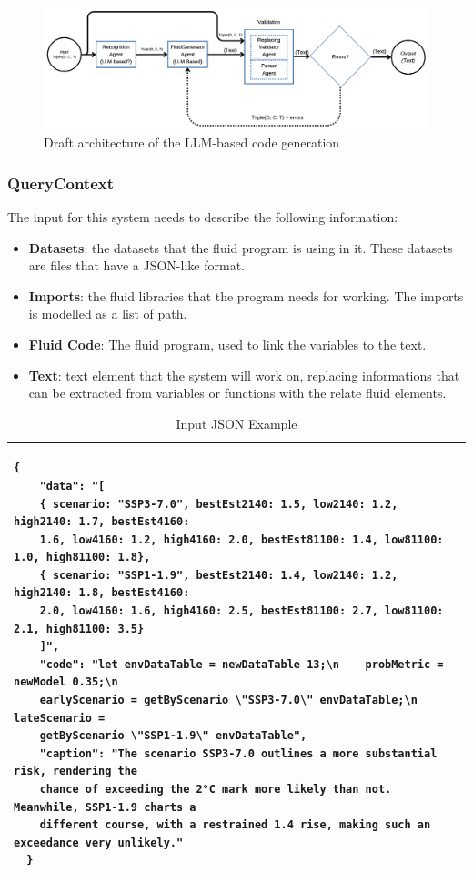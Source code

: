 \begin{figure}
    \centering
    \includegraphics[width=0.95\linewidth]{fig/fluid-llm-architecture.png}
    \caption{Draft architecture of the LLM-based code generation}
    \label{fig:fluid-llm-architecture}
\end{figure}

\subsubsection{QueryContext}
The input for this system needs to describe the following information:
\begin{itemize}
    \item \textbf{Datasets}: the datasets that the fluid program is using in it. These datasets are files that have a JSON-like format.
    \item \textbf{Imports}: the fluid libraries that the program needs for working. The imports is modelled as a list of path.
    \item \textbf{Fluid Code}: The fluid program, used to link the variables to the text.
    \item \textbf{Text}: text element that the system will work on, replacing informations that can be extracted from variables or functions with the relate fluid elements.
\end{itemize}

\begin{table}[!ht]
    \centering
    \caption{Input JSON Example \label{tab:json_fluid_input}}
    \begin{tabular}{p{13cm}}
    \hline
    \hline
    \begin{verbatim}
{
    "data": "[
    { scenario: "SSP3-7.0", bestEst2140: 1.5, low2140: 1.2, high2140: 1.7, bestEst4160:
    1.6, low4160: 1.2, high4160: 2.0, bestEst81100: 1.4, low81100: 1.0, high81100: 1.8},
    { scenario: "SSP1-1.9", bestEst2140: 1.4, low2140: 1.2, high2140: 1.8, bestEst4160:
    2.0, low4160: 1.6, high4160: 2.5, bestEst81100: 2.7, low81100: 2.1, high81100: 3.5}
    ]",
    "code": "let envDataTable = newDataTable 13;\n    probMetric = newModel 0.35;\n
    earlyScenario = getByScenario \"SSP3-7.0\" envDataTable;\n    lateScenario =
    getByScenario \"SSP1-1.9\" envDataTable",
    "caption": "The scenario SSP3-7.0 outlines a more substantial risk, rendering the
    chance of exceeding the 2°C mark more likely than not. Meanwhile, SSP1-1.9 charts a
    different course, with a restrained 1.4 rise, making such an exceedance very unlikely."
  }
\end{verbatim}\\
    \hline \hline
    \end{tabular}
\end{table}

